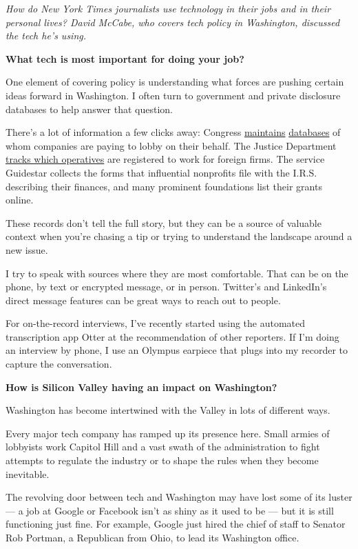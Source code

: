 \emph{How do New York Times journalists use technology in their jobs and
in their personal lives? David McCabe, who covers tech policy in
Washington, discussed the tech he's using.}

\textbf{What tech is most important for doing your job?}

One element of covering policy is understanding what forces are pushing
certain ideas forward in Washington. I often turn to government and
private disclosure databases to help answer that question.

There's a lot of information a few clicks away: Congress
\href{https://soprweb.senate.gov/index.cfm?event=selectfields}{maintains}
\href{http://disclosures.house.gov/ld/ldsearch.aspx}{databases} of whom
companies are paying to lobby on their behalf. The Justice Department
\href{https://efile.fara.gov/ords/f?p=1381:1:244311337896:::::}{tracks
which operatives} are registered to work for foreign firms. The service
Guidestar collects the forms that influential nonprofits file with the
I.R.S. describing their finances, and many prominent foundations list
their grants online.

These records don't tell the full story, but they can be a source of
valuable context when you're chasing a tip or trying to understand the
landscape around a new issue.

I try to speak with sources where they are most comfortable. That can be
on the phone, by text or encrypted message, or in person. Twitter's and
LinkedIn's direct message features can be great ways to reach out to
people.

For on-the-record interviews, I've recently started using the automated
transcription app Otter at the recommendation of other reporters. If I'm
doing an interview by phone, I use an Olympus earpiece that plugs into
my recorder to capture the conversation.

\textbf{How is Silicon Valley having an impact on Washington?}

Washington has become intertwined with the Valley in lots of different
ways.

Every major tech company has ramped up its presence here. Small armies
of lobbyists work Capitol Hill and a vast swath of the administration to
fight attempts to regulate the industry or to shape the rules when they
become inevitable.

The revolving door between tech and Washington may have lost some of its
luster --- a job at Google or Facebook isn't as shiny as it used to be
--- but it is still functioning just fine. For example, Google just
hired the chief of staff to Senator Rob Portman, a Republican from Ohio,
to lead its Washington office.

